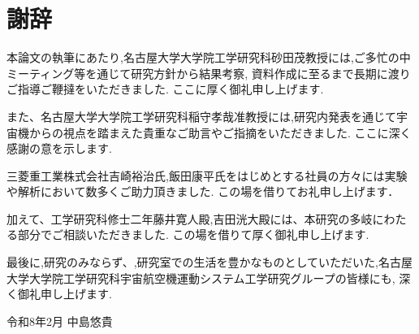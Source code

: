 \chapter*{謝辞}
\par 
本論文の執筆にあたり,名古屋大学大学院工学研究科砂田茂教授には,ご多忙の中ミーティング等を通じて研究方針から結果考察,
資料作成に至るまで長期に渡りご指導ご鞭撻をいただきました.
ここに厚く御礼申し上げます.
\par 
また、名古屋大学大学院工学研究科稲守孝哉准教授には,研究内発表を通じて宇宙機からの視点を踏まえた貴重なご助言やご指摘をいただきました.
ここに深く感謝の意を示します.
\par
三菱重工業株式会社吉崎裕治氏,飯田康平氏をはじめとする社員の方々には実験や解析において数多くご助力頂きました.
この場を借りてお礼申し上げます．
\par 
加えて、工学研究科修士二年藤井寛人殿,吉田洸大殿には、本研究の多岐にわたる部分でご相談いただきました.
この場を借りて厚く御礼申し上げます.
\par 最後に,研究のみならず、,研究室での生活を豊かなものとしていただいた,名古屋大学大学院工学研究科宇宙航空機運動システム工学研究グループの皆様にも,
深く御礼申し上げます.
\begin{flushright}
    令和8年2月 \quad 中島悠貴
\end{flushright}